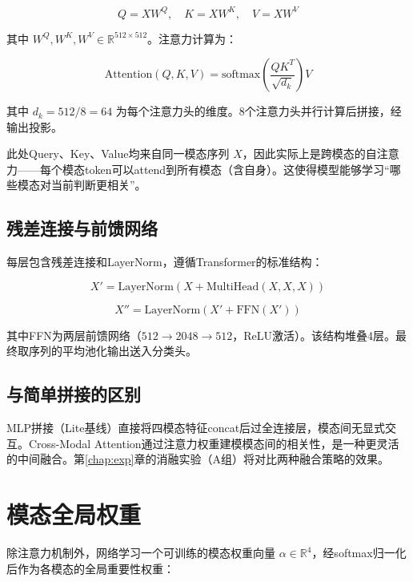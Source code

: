 \begin{equation}
Q = XW^Q, \quad K = XW^K, \quad V = XW^V
\end{equation}

其中 $W^Q, W^K, W^V \in \mathbb{R}^{512 \times 512}$。注意力计算为：

\begin{equation}
\text{Attention}(Q, K, V) = \text{softmax}\left(\frac{QK^T}{\sqrt{d_k}}\right)V
\label{eq:attention}
\end{equation}

其中 $d_k = 512 / 8 = 64$ 为每个注意力头的维度。8个注意力头并行计算后拼接，经输出投影。

此处Query、Key、Value均来自同一模态序列 $X$，因此实际上是跨模态的自注意力——每个模态token可以attend到所有模态（含自身）。这使得模型能够学习``哪些模态对当前判断更相关''。

\subsection{残差连接与前馈网络}

每层包含残差连接和LayerNorm，遵循Transformer的标准结构：

\begin{equation}
X' = \text{LayerNorm}(X + \text{MultiHead}(X, X, X))
\end{equation}

\begin{equation}
X'' = \text{LayerNorm}(X' + \text{FFN}(X'))
\end{equation}

其中FFN为两层前馈网络（$512 \to 2048 \to 512$，ReLU激活）。该结构堆叠4层。最终取序列的平均池化输出送入分类头。

\subsection{与简单拼接的区别}

MLP拼接（Lite基线）直接将四模态特征concat后过全连接层，模态间无显式交互。Cross-Modal Attention通过注意力权重建模模态间的相关性，是一种更灵活的中间融合。第\ref{chap:exp}章的消融实验（A组）将对比两种融合策略的效果。

\section{模态全局权重}
\label{sec:modweight}

除注意力机制外，网络学习一个可训练的模态权重向量 $\alpha \in \mathbb{R}^4$，经softmax归一化后作为各模态的全局重要性权重：

